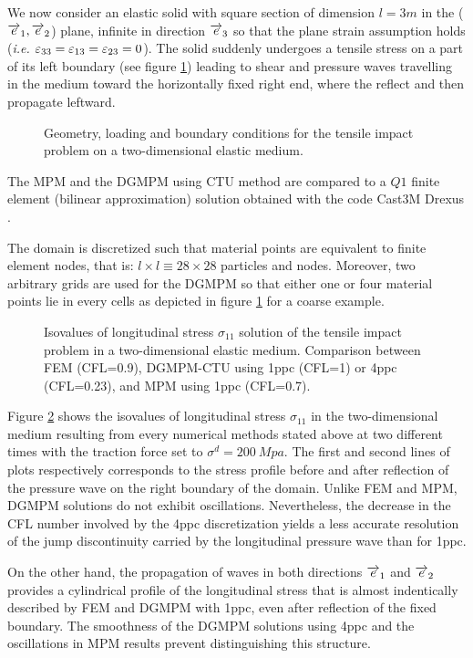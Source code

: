 We now consider an elastic solid with square section of dimension $l=3m$ in the (${\overrightarrow{e}}_1,{\overrightarrow{e}}_2$) plane, infinite in direction ${\overrightarrow{e}}_3$ so that the plane strain assumption holds (\textit{i.e. $\varepsilon_{33}=\varepsilon_{13}=\varepsilon_{23}=0$}). The solid suddenly undergoes a tensile stress on a part of its left boundary (see figure \ref{fig:2D_planeStrain}) leading to shear and pressure waves travelling in the medium toward the horizontally fixed right end, where the reflect and then propagate leftward.
\begin{figure}[h!]
  \centering
   \qquad
  \caption{Geometry, loading and boundary conditions for the tensile impact problem on a two-dimensional elastic medium.}
  \label{fig:2D_planeStrain}
\end{figure}
The MPM and the DGMPM using CTU method are compared to a $Q1$ finite element (bilinear approximation) solution obtained with the code Cast3M Drexus \cite{Castem}.

The domain is discretized such that material points are equivalent to finite element nodes, that is: $l\times l \equiv 28 \times 28$ particles and nodes. Moreover, two arbitrary grids are used for the DGMPM so that either one or four material points lie in every cells as depicted in figure \ref{fig:2D_planeStrain} for a coarse example.
\begin{figure}[h!]
  \centering
  
  \caption{Isovalues of longitudinal stress $\sigma_{11}$ solution of the tensile impact problem in a two-dimensional elastic medium. Comparison between FEM (CFL=0.9), DGMPM-CTU using 1ppc (CFL=1) or 4ppc (CFL=0.23), and MPM using 1ppc (CFL=0.7).}
  \label{fig:2delast_comparison}
\end{figure}
Figure \ref{fig:2delast_comparison} shows the isovalues of longitudinal stress $\sigma_{11}$ in the two-dimensional medium resulting from every numerical methods stated above at two different times with the traction force set to $\sigma^d=200\: Mpa$. The first and second lines of plots respectively corresponds to the stress profile before and after reflection of the pressure wave on the right boundary of the domain.
Unlike FEM and MPM, DGMPM solutions do not exhibit oscillations. Nevertheless, the decrease in the CFL number involved by the 4ppc discretization yields a less accurate resolution of the jump discontinuity carried by the longitudinal pressure wave than for 1ppc.

On the other hand, the propagation of waves in both directions ${\overrightarrow{e}}_1$ and ${\overrightarrow{e}}_2$ provides a cylindrical profile of the longitudinal stress that is almost indentically described by FEM and DGMPM with 1ppc, even after reflection of the fixed boundary. The smoothness of the DGMPM solutions using 4ppc and the oscillations in MPM results prevent distinguishing this structure.




